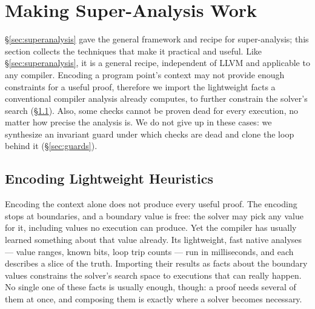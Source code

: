 \documentclass[acmsmall,screen,nonacm]{acmart}
\begin{document}
\section{Making Super-Analysis Work}
\label{sec:making}
\S\ref{sec:superanalysis} gave the general framework and recipe for super-analysis; this section collects the techniques that make
it practical and useful. Like
\S\ref{sec:superanalysis}, it is a general recipe, independent of
LLVM and applicable to any compiler. Encoding a program point's context may not provide enough constraints for a useful proof, therefore we import the lightweight facts a
conventional compiler analysis already computes, to further constrain the solver's search
(\S\ref{sec:conjunction}). Also, some checks
cannot be proven dead for every execution, no matter how precise the analysis is. We do not give up in these cases: we synthesize an invariant guard under
which checks are dead and clone the loop behind it (\S\ref{sec:guards}).

\subsection{Encoding Lightweight Heuristics}
\label{sec:conjunction}
Encoding the context alone does not produce every useful proof. The
encoding stops at boundaries, and a boundary value is free: the solver
may pick any value for it, including values no execution can produce.
Yet the compiler has usually learned something about that value
already. Its lightweight, fast native analyses --- value ranges, known
bits, loop trip counts --- run in milliseconds, and each describes a
slice of the truth. Importing their results as facts about the boundary
values constrains the solver's search space to executions that can
really happen. No single one of these facts is usually enough, though:
a proof needs several of them at once, and composing them is exactly
where a solver becomes necessary.
\end{document}

